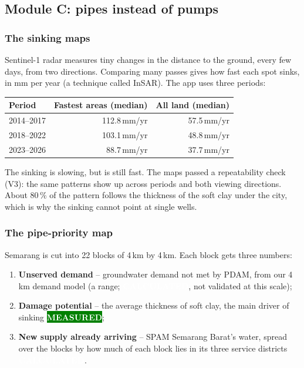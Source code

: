 \documentclass[11pt,a4paper]{article}
\newcommand{\pv}[2]{{\setlength{\fboxsep}{1.3pt}\colorbox{#1}{\textcolor{white}{\sffamily\bfseries\fontsize{6.3}{7}\selectfont #2}}}}
\newcommand{\Mea}{\pv{green}{MEASURED}}
\newcommand{\Calc}{\pv{calc}{CALCULATED}}
\begin{document}
\subsection{Module C: pipes instead of pumps}\label{sec:c}

\subsubsection{The sinking maps}
Sentinel-1 radar measures tiny changes in the distance to the ground, every few days, from two directions.
Comparing many passes gives how fast each spot sinks, in mm per year (a technique called InSAR). The app
uses three periods:

\begin{center}
\small
\begin{tabular}{@{}lrr@{}}
\toprule
\textbf{Period} & \textbf{Fastest areas (median)} & \textbf{All land (median)}\\
\midrule
2014--2017 & 112.8\,mm/yr & 57.5\,mm/yr\\
2018--2022 & 103.1\,mm/yr & 48.8\,mm/yr\\
2023--2026 & 88.7\,mm/yr & 37.7\,mm/yr\\
\bottomrule
\end{tabular}
\end{center}

The sinking is slowing, but is still fast. The maps passed a repeatability check (V3): the same patterns
show up across periods and both viewing directions. About 80\,\% of the pattern follows the thickness of
the soft clay under the city, which is why the sinking cannot point at single wells.

\subsubsection{The pipe-priority map}
Semarang is cut into 22 blocks of 4\,km by 4\,km. Each block gets three numbers:

\begin{enumerate}
\item \textbf{Unserved demand} -- groundwater demand not met by PDAM, from our 4\,km demand model (a
  range; \Calc, not validated at this scale);
\item \textbf{Damage potential} -- the average thickness of soft clay, the main driver of sinking \Mea;
\item \textbf{New supply already arriving} -- SPAM Semarang Barat's water, spread over the blocks by how
  much of each block lies in its three service districts \Calc.
\end{enumerate}
\end{document}
